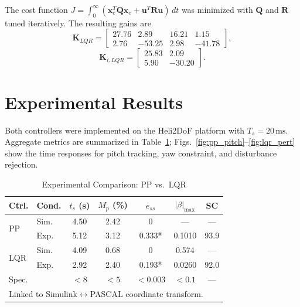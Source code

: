 \documentclass[conference]{IEEEtran}
\begin{document}
The cost function $J = \int_0^\infty (\mathbf{x}_e^T \mathbf{Q} \mathbf{x}_e + \mathbf{u}^T \mathbf{R} \mathbf{u})\,dt$ was minimized with $\mathbf{Q}$ and $\mathbf{R}$ tuned iteratively. The resulting gains are
\begin{equation}
\mathbf{K}_{LQR} = \begin{bmatrix} 27.76 & 2.89 & 16.21 & 1.15 \\ 2.76 & -53.25 & 2.98 & -41.78 \end{bmatrix},
\end{equation}
\begin{equation}
\mathbf{K}_{i,LQR} = \begin{bmatrix} 25.83 & 2.09 \\ 5.90 & -30.20 \end{bmatrix}.
\end{equation}

\section{Experimental Results}
\label{sec:experimental}

Both controllers were implemented on the Heli2DoF platform with $T_s = 20\,\text{ms}$. Aggregate metrics are summarized in Table~\ref{tab:comp}; Figs.~\ref{fig:pp_pitch}--\ref{fig:lqr_pert} show the time responses for pitch tracking, yaw constraint, and disturbance rejection.

\begin{table}[H]
    \centering
    \caption{Experimental Comparison: PP vs.\ LQR}
    \label{tab:comp}
    \footnotesize
    \begin{tabular}{llccccc}
        \toprule
        \textbf{Ctrl.} & \textbf{Cond.} & $t_s$ (s) & $M_p$ (\%) & $e_{ss}$ & $|\beta|_{\max}$ & SC \\
        \midrule
        \multirow{2}{*}{PP}  & Sim. & 4.50 & 2.42 & 0      & ---    & ---  \\
                             & Exp. & 5.12 & 3.12 & 0.333* & 0.1010 & 93.9 \\
        \midrule
        \multirow{2}{*}{LQR} & Sim. & 4.09 & 0.68 & 0      & 0.574  & ---  \\
                             & Exp. & 2.92 & 2.40 & 0.193* & 0.0260 & 92.0 \\
        \midrule
        \multicolumn{2}{l}{Spec.} & $<8$ & $<5$ & $<0.003$ & $<0.1$ & --- \\
        \bottomrule
        \multicolumn{7}{l}{\scriptsize *Linked to Simulink$\leftrightarrow$PASCAL coordinate transform.}
    \end{tabular}
\end{table}
\end{document}
